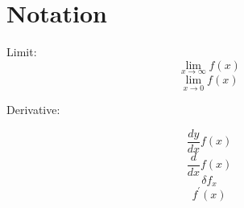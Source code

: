 \section{Notation}
\noindent

Limit:
$$\lim_{x \to \infty} f(x)$$
$$\lim_{x \to 0} f(x)$$

Derivative:

$$\frac{dy}{dx}f(x)$$
$$\frac{d}{dx}f(x)$$
$$\delta f_{x}$$
$$f^\prime(x)$$

